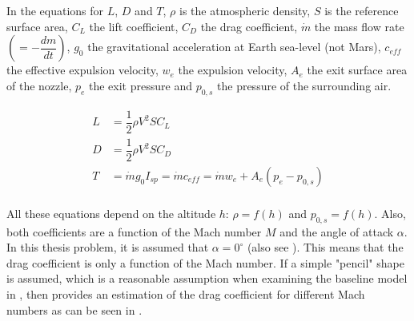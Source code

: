 
In the equations for $L$, $D$ and $T$, $\rho$ is the atmospheric density, $S$ is the reference surface area, $C_{L}$ the lift coefficient, $C_{D}$ the drag coefficient, $\dot{m}$ the mass flow rate $\left(=-\dfrac{dm}{dt}\right)$, $g_{0}$ the gravitational acceleration at Earth sea-level (not Mars), $c_{eff}$ the effective expulsion velocity, $w_{e}$ the expulsion velocity, $A_{e}$ the exit surface area of the nozzle, $p_{e}$ the exit pressure and $p_{0,s}$ the pressure of the surrounding air. 


\begin{equation} \label{eq:l_d_t}
\begin{split}
L&=\dfrac{1}{2}\rho V^{2}S C_{L}\\
D&=\dfrac{1}{2}\rho V^{2}S C_{D}\\
T&=\dot{m}g_{0}I_{sp}=\dot{m}c_{eff}=\dot{m}w_{e}+A_{e}\left(p_{e}-p_{0,s}\right)\\
\end{split}
\end{equation}




All these equations depend on the altitude $h$: $\rho=f\left(h\right)$ and $p_{0,s}=f\left(h\right)$. Also, both coefficients are a function of the Mach number $M$ and the angle of attack $\alpha$. In this thesis problem, it is assumed that $\alpha=0^{\circ}$ (also see ). This means that the drag coefficient is only a function of the Mach number. If a simple "pencil" shape is assumed, which is a reasonable assumption when examining the baseline model in , then \cite{whitehead2004mars} provides an estimation of the drag coefficient for different Mach numbers as can be seen in . 

